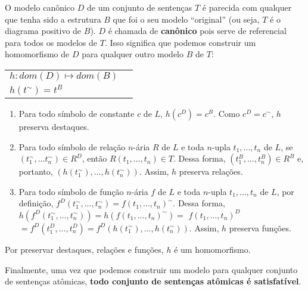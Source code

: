 O modelo canônico $D$ de um conjunto de sentenças $T$ é parecida com qualquer que tenha sido a estrutura $B$ que foi o seu modelo ``original'' (ou seja, $T$ é o diagrama positivo de $B$). $D$ é chamada de \textbf{canônico} pois serve de referencial para todos os modelos de $T$. Isso significa que podemos construir um homomorfismo de $D$ para qualquer outro modelo $B$ de $T$:
\begin{center}
    \begin{tabular}{l l}
        $h: dom(D) \mapsto dom(B)$ \\
        $h(t^\sim) = t^B$
    \end{tabular}
\end{center}
\begin{enumerate}
    \item Para todo símbolo de constante $c$ de $L$, $h(c^D) = c^B$. Como $c^D = c^\sim$, $h$ preserva destaques.
    \item Para todo símbolo de relação $n$-ária $R$ de $L$ e toda $n$-upla $t_1,...,t_n$ de $L$, se $(t_1^\sim,...t_n^\sim) \in R^D$, então $R(t_1,...,t_n) \in T$. Dessa forma, $(t_1^B,...,t_n^B) \in R^B$ e, portanto, $(h(t_1^\sim), ..., h(t_n^\sim))$. Assim, $h$ preserva relações.
    \item Para todo símbolo de função $n$-ária $f$ de $L$ e toda $n$-upla $t_1,...,t_n$ de $L$, por definição, $f^D(t_1^\sim,...,t_n^\sim) = f(t_1,...,t_n)^\sim$. Dessa forma, $h(f^D(t_1^\sim,...,t_n^\sim)) = h(f(t_1,...,t_n)^\sim) =$ $f(t_1,...,t_n)^D$ $= f^D(t_1^D,...,t_n^D) = f^D(h(t_1^\sim),...,h(t_n^\sim))$. Assim, $h$ preserva funções.
\end{enumerate}

Por preservar destaques, relações e funções, $h$ é um homomorfismo.

Finalmente, uma vez que podemos construir um modelo para qualquer conjunto de sentenças atômicas, \textbf{todo conjunto de sentenças atômicas é satisfatível}.